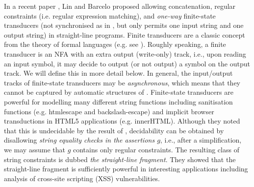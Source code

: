 In a recent paper \cite{LB16}, Lin and Barcelo 
proposed allowing concatenation, regular constraints (i.e. regular expression 
matching), and \emph{one-way} finite-state transducers (not synchronised as in \cite{BTV09}, but only permits one input string and one output string) in 
straight-line programs. Finite transducers are a classic concept from
the theory of formal languages (e.g. see \cite{Berstel}).
Roughly speaking, a finite transducer is an NFA with an extra output (write-only) 
track, i.e., upon reading an input symbol, it may decide to output (or not output) a symbol 
on the output track. We will define this in more detail below.
In general, the input/output tracks of finite-state transducers may be 
\emph{asynchronous}, which means that they cannot be captured by automatic structures of \cite{BG04}. 
Finite-state transducers are powerful for modelling many
different string functions including sanitisation functions (e.g. htmlescape and
backslash-escape) and implicit browser transductions in HTML5 applications (e.g.
innerHTML). Although they noted that this is
undecidable by the result of \cite{BFL13}, decidability can be obtained 
by disallowing \emph{string equality checks in the assertions $g$}, i.e., after
a simplification, we may assume that $g$ contains only regular constraints.
The 
resulting class of string constraints is dubbed \emph{the straight-line 
fragment}.
They showed that the straight-line fragment is sufficiently powerful in
interesting applications including analysis of cross-site scripting (XSS)
vulnerabilities. 

